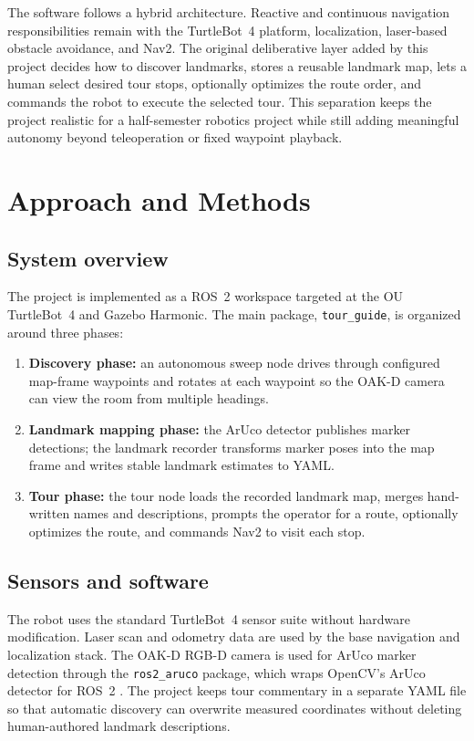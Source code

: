 \documentclass[12pt]{article}
\begin{document}
The software follows a hybrid architecture. Reactive and continuous navigation responsibilities remain with the TurtleBot~4 platform, localization, laser-based obstacle avoidance, and Nav2. The original deliberative layer added by this project decides how to discover landmarks, stores a reusable landmark map, lets a human select desired tour stops, optionally optimizes the route order, and commands the robot to execute the selected tour. This separation keeps the project realistic for a half-semester robotics project while still adding meaningful autonomy beyond teleoperation or fixed waypoint playback.

\section*{Approach and Methods}
\subsection*{System overview}
The project is implemented as a ROS~2 workspace targeted at the OU TurtleBot~4 and Gazebo Harmonic. The main package, \texttt{tour\_guide}, is organized around three phases:
\begin{enumerate}
    \item \textbf{Discovery phase:} an autonomous sweep node drives through configured map-frame waypoints and rotates at each waypoint so the OAK-D camera can view the room from multiple headings.
    \item \textbf{Landmark mapping phase:} the ArUco detector publishes marker detections; the landmark recorder transforms marker poses into the map frame and writes stable landmark estimates to YAML.
    \item \textbf{Tour phase:} the tour node loads the recorded landmark map, merges hand-written names and descriptions, prompts the operator for a route, optionally optimizes the route, and commands Nav2 to visit each stop.
\end{enumerate}

\subsection*{Sensors and software}
The robot uses the standard TurtleBot~4 sensor suite without hardware modification. Laser scan and odometry data are used by the base navigation and localization stack. The OAK-D RGB-D camera is used for ArUco marker detection through the \texttt{ros2\_aruco} package, which wraps OpenCV's ArUco detector for ROS~2 \cite{ros2_aruco}. The project keeps tour commentary in a separate YAML file so that automatic discovery can overwrite measured coordinates without deleting human-authored landmark descriptions.
\end{document}
